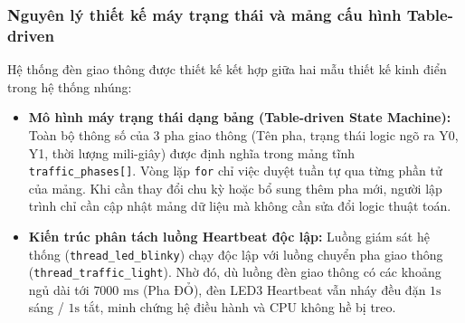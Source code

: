 \subsubsection{Nguyên lý thiết kế máy trạng thái và mảng cấu hình Table-driven}
Hệ thống đèn giao thông được thiết kế kết hợp giữa hai mẫu thiết kế kinh điển trong hệ thống nhúng:
\begin{itemize}
    \item \textbf{Mô hình máy trạng thái dạng bảng (Table-driven State Machine):} Toàn bộ thông số của 3 pha giao thông (Tên pha, trạng thái logic ngõ ra Y0, Y1, thời lượng mili-giây) được định nghĩa trong mảng tĩnh \texttt{traffic\_phases[]}. Vòng lặp \texttt{for} chỉ việc duyệt tuần tự qua từng phần tử của mảng. Khi cần thay đổi chu kỳ hoặc bổ sung thêm pha mới, người lập trình chỉ cần cập nhật mảng dữ liệu mà không cần sửa đổi logic thuật toán.
    \item \textbf{Kiến trúc phân tách luồng Heartbeat độc lập:} Luồng giám sát hệ thống (\texttt{thread\_led\_blinky}) chạy độc lập với luồng chuyển pha giao thông (\texttt{thread\_traffic\_light}). Nhờ đó, dù luồng đèn giao thông có các khoảng ngủ dài tới $7000\text{ ms}$ (Pha ĐỎ), đèn LED3 Heartbeat vẫn nháy đều đặn $1\text{s}$ sáng / $1\text{s}$ tắt, minh chứng hệ điều hành và CPU không hề bị treo.
\end{itemize}


